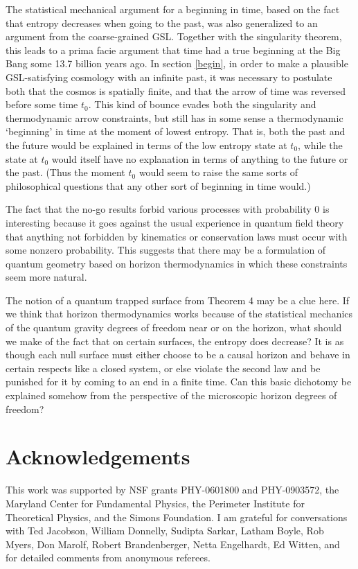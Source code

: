 \documentclass[12pt]{article}
\begin{document}
The statistical mechanical argument for a beginning in time, based on the fact that entropy decreases when going to the past, was also generalized to an argument from the coarse-grained GSL.  Together with the singularity theorem, this leads to a prima facie argument that time had a true beginning at the Big Bang some 13.7 billion years ago.  In section \ref{begin}, in order to make a plausible GSL-satisfying cosmology with an infinite past, it was necessary to postulate both that the cosmos is spatially finite, and that the arrow of time was reversed before some time $t_0$.  This kind of bounce evades both the singularity and thermodynamic arrow constraints, but still has in some sense a thermodynamic `beginning' in time at the moment of lowest entropy.  That is, both the past and the future would be explained in terms of the low entropy state at $t_0$, while the state at $t_0$ would itself have no explanation in terms of anything to the future or the past.  (Thus the moment $t_0$ would seem to raise the same sorts of philosophical questions that any other sort of beginning in time would.)

The fact that the no-go results forbid various processes with probability 0 is interesting because it goes against the usual experience in quantum field theory that anything not forbidden by kinematics or conservation laws must occur with some nonzero probability.  This suggests that there may be a formulation of quantum geometry based on horizon thermodynamics in which these constraints seem more natural.

The notion of a quantum trapped surface from Theorem 4 may be a clue here.  If we think that horizon thermodynamics works because of the statistical mechanics of the quantum gravity degrees of freedom near or on the horizon, what should we make of the fact that on certain surfaces, the entropy does decrease?  It is as though each null surface must either choose to be a causal horizon and behave in certain respects like a closed system, or else violate the second law and be punished for it by coming to an end in a finite time.  Can this basic dichotomy be explained somehow from the perspective of the microscopic horizon degrees of freedom?

\section*{Acknowledgements}
\small
This work was supported by NSF grants PHY-0601800 and PHY-0903572, the Maryland Center for Fundamental Physics, the Perimeter Institute for Theoretical Physics, and the Simons Foundation.  I am grateful for conversations with Ted Jacobson, William Donnelly, Sudipta Sarkar, Latham Boyle, Rob Myers, Don Marolf, Robert Brandenberger, Netta Engelhardt, Ed Witten, and for detailed comments from anonymous referees.
\normalsize
\end{document}
